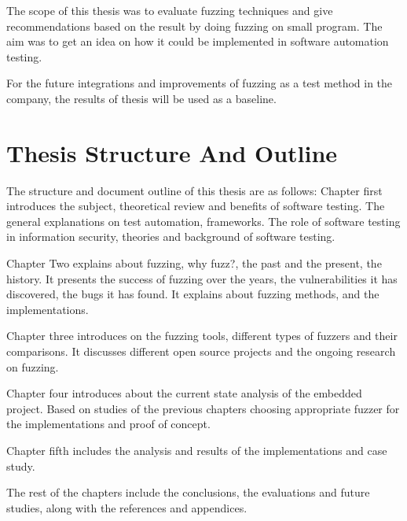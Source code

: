 The scope of this thesis was to evaluate fuzzing techniques and give recommendations based on the result by
doing fuzzing on small program. The aim was to get an idea on how it could be implemented in software automation
testing.\newline


For the future integrations and improvements of fuzzing as a test method in the company,
the results of thesis will be used as a baseline.\newline


\section{Thesis Structure And Outline}

The structure and document outline of this thesis are as follows:\newline
Chapter first introduces the subject, theoretical review and benefits of software testing. The
general explanations on test automation, frameworks. The role of software testing in information security,
theories and background of software testing.\newline

Chapter Two explains about fuzzing, why fuzz?, the past and the present, the history. It presents the success of
fuzzing over the years, the vulnerabilities it has discovered, the bugs it has found. It explains about
fuzzing methods, and the implementations.\newline

Chapter three introduces on the fuzzing tools, different types of fuzzers and their comparisons. It
discusses different open source projects and the ongoing research on fuzzing.\newline

Chapter four introduces about the current state analysis of the embedded project. Based on studies of
the previous chapters choosing appropriate fuzzer for the implementations and proof of concept.\newline

Chapter fifth includes the analysis and results of the implementations and case study.\newline

The rest of the chapters include the conclusions, the evaluations and future studies, along with the references
and appendices.\newline
